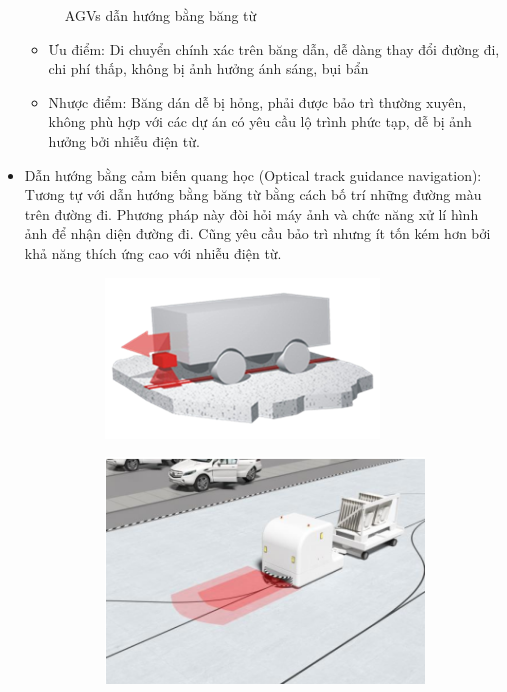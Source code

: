 \begin{itemize}
\begin{figure}[H]
                \caption{AGVs dẫn hướng bằng băng từ}
                \label{chap1_pic6}
            \end{figure}
        \begin{itemize}[label=\textendash]
            \item Ưu điểm: Di chuyển chính xác trên băng dẫn, dễ dàng thay đổi đường đi, chi phí
            thấp, không bị ảnh hưởng ánh sáng, bụi bẩn
            \item Nhược điểm: Băng dán dễ bị hỏng, phải được bảo trì thường xuyên, không phù
            hợp với các dự án có yêu cầu lộ trình phức tạp, dễ bị ảnh hưởng bởi nhiễu điện từ. 
        \end{itemize} 
        \item Dẫn hướng bằng cảm biến quang học (Optical track guidance navigation): Tương tự với dẫn hướng bằng băng từ
        bằng cách bố trí những đường màu trên đường đi. Phương pháp này đòi hỏi máy ảnh và chức năng xử lí hình ảnh để nhận diện đường đi. Cũng yêu cầu bảo trì 
        nhưng ít tốn kém hơn bởi khả năng thích ứng cao với nhiễu điện từ. 
            \begin{figure}[H]
                \begin{subfigure}{0.5\textwidth}
                \centering
                \includegraphics[width=0.6\linewidth, right]{pictures/chapter1/chapter1_pic_7a.png} 
                \label{chap1_pic7a}
                \end{subfigure}
                \begin{subfigure}{0.7\textwidth}
                \includegraphics[width=0.5\linewidth]{pictures/chapter1/chapter1_pic_7b.png}

\end{subfigure}
\end{figure}
\end{itemize}
